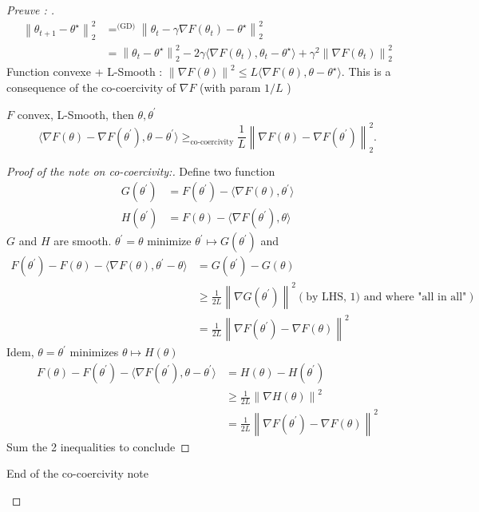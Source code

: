 \begin{proof}[Preuve : ]
    \begin{align*}
        \left\| \theta _{t+1} - \theta ^\star  \right\| ^2 _2  
            &= ^{\text{(GD)}} \left\| \theta _t - \gamma \nabla F(\theta _t) - \theta ^\star  \right\| ^2 _2 \\
            &= \left\| \theta _t - \theta ^\star  \right\| ^2 _2 - 2 \gamma  \langle \nabla F(\theta _t), \theta _t - \theta ^\star \rangle + \gamma ^2 \left\| \nabla F(\theta _t) \right\| ^2 _2
    \end{align*}
    Function convexe + L-Smooth : $ \left\| \nabla F(\theta ) \right\| ^2 \leq L \langle \nabla F(\theta ), \theta  - \theta ^\star \rangle $. This is a consequence of the co-coercivity of $ \nabla F $ (with param $ 1/L $ )
    \begin{note}[Co-coercivity]
        $ F $ convex, L-Smooth, then $ \theta , \theta ^\prime  $ 
        \[
            \langle  \nabla F(\theta ) - \nabla F(\theta ^\prime ), \theta  - \theta ^\prime \rangle \geq_{\text{co-coercivity}} \frac{1}{L} \left\| \nabla F(\theta ) - \nabla F(\theta ^\prime ) \right\| ^2 _2
        .\]
        \begin{proof}[Proof of the note on co-coercivity:]
            Define two function \begin{align*}
                G(\theta ^\prime ) &= F(\theta ^\prime ) - \langle \nabla F(\theta ) , \theta ^\prime \rangle  \\
                H(\theta ^\prime ) &= F(\theta ) - \langle \nabla F(\theta ^\prime ), \theta \rangle 
            \end{align*}
            $ G $ and $ H $ are smooth. $ \theta ^\prime = \theta  $ minimize $ \theta ^\prime  \mapsto G(\theta ^\prime ) $ and 
            \begin{align*}
                F(\theta ^\prime) - F(\theta ) - \langle \nabla F(\theta ) , \theta ^\prime - \theta  \rangle
                    &= G(\theta ^\prime) - G(\theta ) \\
                    &\geq \frac{1}{2L} \left\| \nabla G(\theta ^\prime ) \right\| ^2 (\text{by LHS, 1) and where "all in all"} ) \\
                    &= \frac{1}{2L} \left\| \nabla F(\theta ^\prime ) - \nabla F(\theta ) \right\| ^2
            \end{align*} 
            Idem, $ \theta  = \theta ^\prime  $ minimizes $ \theta \mapsto H(\theta ) $ 
            \begin{align*}
                F(\theta ) - F(\theta ^\prime ) - \langle \nabla F(\theta ^\prime ), \theta  - \theta ^\prime \rangle &= H (\theta ) - H(\theta ^\prime ) \\
                &\geq \frac{1}{2L} \left\| \nabla H(\theta )  \right\| ^2 \\
                &= \frac{1}{2L} \left\| \nabla F(\theta ^\prime ) - \nabla F(\theta ) \right\| ^2
            \end{align*}
            Sum the 2 inequalities to conclude
        \end{proof}
        End of the co-coercivity note
    \end{note}
    

\end{proof}
